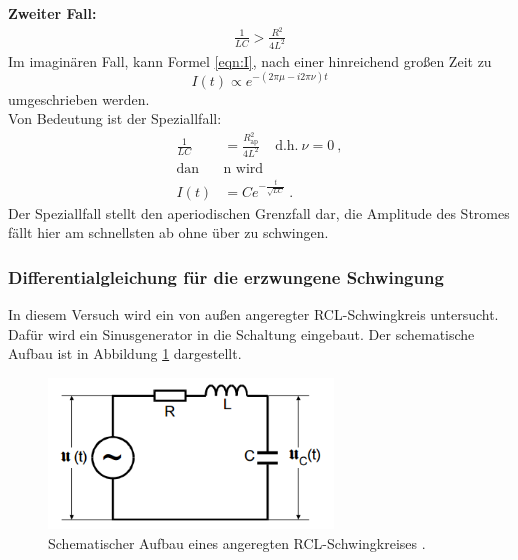 \newline
\newline
\textbf{Zweiter Fall:}
\begin{align*}
	\frac{1}{LC} > \frac{R^2}{4L^2}
\end{align*}
Im imaginären Fall, kann Formel \ref{eqn:I}, nach einer hinreichend großen Zeit zu
\begin{equation}
	I(t) \propto e^{-(2 \pi \mu - i2 \pi \nu)t}
\end{equation}
umgeschrieben werden. \\
Von Bedeutung ist der Speziallfall:
\begin{align}
  \frac{1}{LC} & = \frac{R_\text{ap}^2}{4L^2} \ \ \ \ \ \text{d.h.} \ \nu = 0 \ , \\
	\label{eqn:Rap}
	\text{dan}&\text{n wird} \\
	I(t) & = C e^{- \frac{t}{\sqrt{LC}}} \ .
\end{align}
Der Speziallfall stellt den aperiodischen Grenzfall dar, die Amplitude des Stromes fällt hier am schnellsten ab ohne über zu schwingen.

\subsubsection{Differentialgleichung für die erzwungene Schwingung}
In diesem Versuch wird ein von außen angeregter RCL-Schwingkreis untersucht. Dafür wird ein Sinusgenerator in die Schaltung eingebaut. Der schematische Aufbau ist in Abbildung \ref{fig:aRCL} dargestellt.

\begin{figure}[H]
	\centering
	\includegraphics[height=4cm]{picture/Theorie2.PNG}
	\caption{Schematischer Aufbau eines angeregten RCL-Schwingkreises \cite[289]{sample}.}
	\label{fig:aRCL}
\end{figure}

